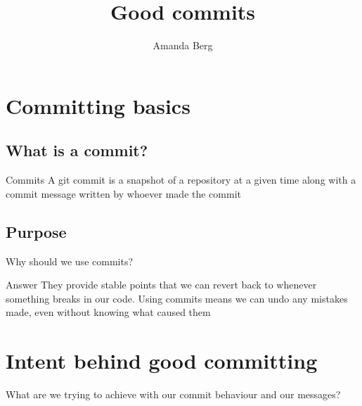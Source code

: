 \title{%
  Good commits
}
\author{Amanda Berg}


\mode*


\section{Committing basics}

\subsection{What is a commit?}

\begin{frame}
    \begin{block}{Commits}
    A git commit is a snapshot of a repository at a given time along with a commit message written by whoever made the commit
    \end{block} 
\end{frame}


\subsection{Purpose}
\begin{frame}
  \begin{question}
    Why should we use commits?
  \end{question}
  \pause 
  \begin{block}{Answer}
    They provide stable points that we can revert back to whenever something breaks in our code. Using commits means we can undo any mistakes made, even without knowing what caused them
  \end{block}
\end{frame}

\section{Intent behind good committing}
\begin{frame}
\begin{question}
    What are we trying to achieve with our commit behaviour and our messages?
\end{question}
\end{frame}


